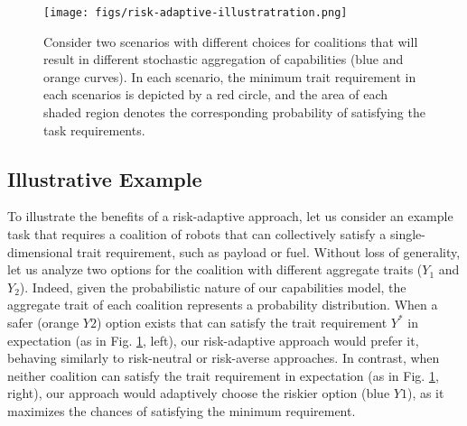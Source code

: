 \documentclass[letterpaper, 10 pt, conference]{ieeeconf}  %
\newcommand{\blue}[1]{\color{blue} #1 \color{black}}
\begin{document}
\begin{figure}
    \centering
    \texttt{[image: figs/risk-adaptive-illustratration.png]}
    \caption{Consider two scenarios with different choices for coalitions that will result in different stochastic aggregation of capabilities (blue and orange curves). In each scenario, the minimum trait requirement in each scenarios is depicted by a red circle, and the area of each shaded region denotes the corresponding probability of satisfying the task requirements. 
    }
    \label{fig:illustration}
\end{figure}

\subsection{Illustrative Example}
\label{subsec:example}

To illustrate the benefits of a risk-adaptive approach, let us consider an example task that requires a coalition of robots that can collectively satisfy a single-dimensional trait requirement, such as payload or fuel. Without loss of generality, let us analyze two options for the coalition with different aggregate traits ($Y_1$ and $Y_2$). Indeed, given the probabilistic nature of our capabilities model, the aggregate trait of each coalition represents a probability distribution. When a safer (orange $Y2$) option exists that can satisfy the trait requirement $Y^*$ in expectation (as in Fig. \ref{fig:illustration}, left), our risk-adaptive approach would prefer it, behaving similarly to risk-neutral or risk-averse approaches. In contrast, when neither coalition can satisfy the trait requirement in expectation (as in Fig. \ref{fig:illustration}, right), our approach would adaptively choose the riskier option (blue $Y1$), as it maximizes the chances of satisfying the minimum requirement.


\end{document}
